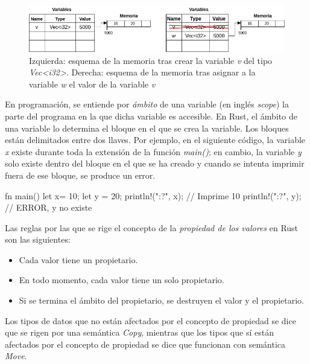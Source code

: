 \begin{figure}[htb]
   \begin{center}
      \includegraphics[width=\textwidth]{img/memoria_3.png}
      \caption{Izquierda: esquema de la memoria tras crear la variable \textit{v} del tipo \textit{Vec<i32>}. Derecha: esquema de la memoria tras asignar a la variable \textit{w} el valor de la variable \textit{v}}
      \label{fig_memoria_3}
   \end{center}
\end{figure}

En programación, se entiende por \textit{ámbito} de una variable (en inglés \textit{scope}) la parte del programa en la que dicha variable es accesible. En Rust, el ámbito de una variable lo determina el bloque en el que se crea la variable. Los bloques están delimitados entre dos llaves. Por ejemplo, en el siguiente código, la variable \textit{x} existe durante toda la extensión de la función \textit{main()}; en cambio, la variable \textit{y} solo existe dentro del bloque en el que se ha creado y cuando se intenta imprimir fuera de ese bloque, se produce un error.

\vspace{0.7em}
\begin{Codigo}
fn main() {
   let x= 10;
   {
      let y = 20;
   }
   println!("{:?}", x); // Imprime 10
   println!("{:?}", y); // ERROR, y no existe
}
\end{Codigo}

Las reglas por las que se rige el concepto de la \textit{propiedad de los valores} en Rust son las siguientes:

\begin{itemize}
   \item Cada valor tiene un propietario.
   \item En todo momento, cada valor tiene un solo propietario.
   \item Si se termina el ámbito del propietario, se destruyen el valor y el propietario.
\end{itemize}

Los tipos de datos que no están afectados por el concepto de propiedad se dice que se rigen por una semántica \textit{Copy}, mientras que los tipos que sí están afectados por el concepto de propiedad se dice que funcionan con semántica \textit{Move}.

